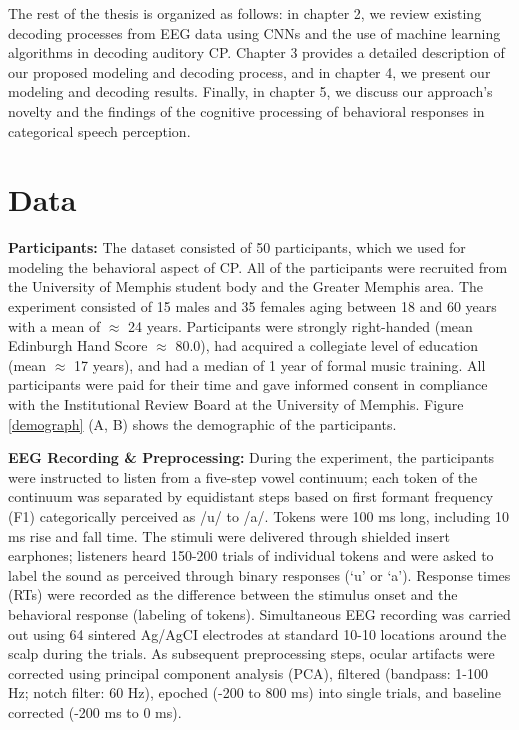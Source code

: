 \documentclass{article}
\begin{document}
The rest of the thesis is organized as follows: in chapter 2, we review existing decoding processes from EEG data using CNNs and the use of machine learning algorithms in decoding auditory CP. Chapter 3 provides a detailed description of our proposed modeling and decoding process, and in chapter 4, we present our modeling and decoding results. Finally, in chapter 5, we discuss our approach's novelty and the findings of the cognitive processing of behavioral responses in categorical speech perception.


\section{Data}

\textbf{Participants:} The dataset consisted of 50 participants, which we used for modeling the behavioral aspect of CP. All of the participants were recruited from the University of Memphis student body and the Greater Memphis area. The experiment consisted of 15 males and 35 females aging between 18 and 60 years with a mean of $\approx$ 24 years. Participants were strongly right-handed (mean Edinburgh Hand Score $\approx$ 80.0), had acquired a collegiate level of education (mean $\approx$ 17 years), and had a median of 1 year of formal music training. All participants were paid for their time and gave informed consent in compliance with the Institutional Review Board at the University of Memphis. Figure \ref{demograph} (A, B) shows the demographic of the participants.

\textbf{EEG Recording \& Preprocessing:} During the experiment, the participants were instructed to listen from a five-step vowel continuum; each token of the continuum was separated by equidistant steps based on first formant frequency (F1) categorically perceived as /u/ to /a/. Tokens were 100 ms long, including 10 ms rise and fall time. The stimuli were delivered through shielded insert earphones; listeners heard 150-200 trials of individual tokens and were asked to label the sound as perceived through binary responses (‘u’ or ‘a’). Response times (RTs) were recorded as the difference between the stimulus onset and the behavioral response (labeling of tokens). Simultaneous EEG recording was carried out using 64 sintered Ag/AgCI electrodes at standard 10-10 locations around the scalp during the trials. As subsequent preprocessing steps, ocular artifacts were corrected using principal component analysis (PCA), filtered (bandpass: 1-100 Hz; notch filter: 60 Hz), epoched (-200 to 800 ms) into single trials, and baseline corrected (-200 ms to 0 ms).
\end{document}
